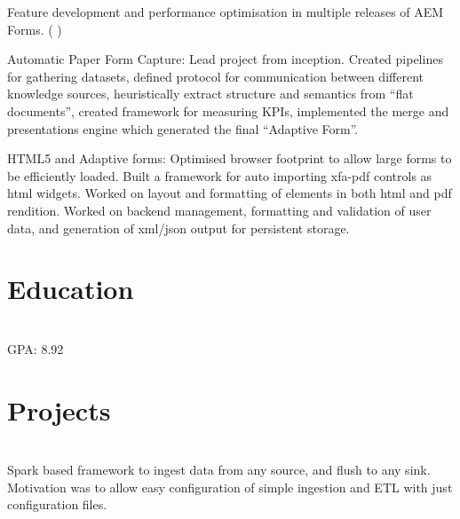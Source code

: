 \documentclass[]{deedy-resume-openfont}
\begin{document}
\sectionsep
{}\hfill {}
\begin{tightemize}
	\item Feature development and performance optimisation in multiple releases of AEM Forms.\newline
    (
        {}
    )
	\item Automatic Paper Form Capture: Lead project from inception. Created pipelines for gathering datasets, defined protocol for communication between different knowledge sources, heuristically extract structure and semantics from “ﬂat documents”, created framework for measuring KPIs, implemented the merge and presentations engine which generated the final “Adaptive Form”.
	\item HTML5 and Adaptive forms: Optimised browser footprint to allow large forms to be efficiently loaded. Built a framework for auto importing xfa-pdf controls as html widgets. Worked on layout and formatting of elements in both html and pdf rendition. Worked on backend management, formatting and validation of user data, and generation of xml/json output for persistent storage.
\end{tightemize}
\sectionsep

%
%
\section{Education}
\raggedright

\hfill {}\\
GPA: 8.92\\
\sectionsep
%
%
\section{Projects}
\raggedright

\hfill {}\\
Spark based framework to ingest data from any source, and flush to any sink. Motivation was to allow easy configuration of simple ingestion and ETL with just configuration files.\\
\sectionsep
  
\end{document}
